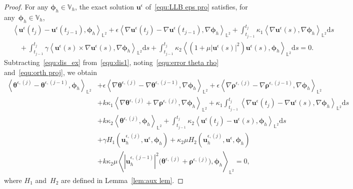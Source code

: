 \documentclass[11pt,reqno]{amsart}
\theoremstyle{definition}
\numberwithin{equation}{section}
\newcommand{\bff}{\boldsymbol}
\newcommand{\bb}{\mathbb}
\newcommand{\ds}{\mathrm{d}s}
\newcommand{\nn}{\nonumber}
\newcommand{\inpro}[2]{\left\langle#1,#2\right\rangle}
\begin{document}
\begin{proof}
For any $ \bff{\phi}_h\in\bb{V}_h$, the exact solution $\bff{u}^\epsilon$
of~\eqref{equ:LLB eps pro} satisfies, for any~$\bff{\phi}_h\in\bb{V}_h$,
\begin{align}\label{equ:dis_ex}
&\inpro{\bff{u}^\epsilon(t_j)-\bff{u}^\epsilon(t_{j-1})}{\bff{\phi}_h}_{\bb{L}^2}
+
\epsilon\inpro{\nabla\bff{u}^\epsilon(t_j)-\nabla\bff{u}^\epsilon(t_{j-1})}{\nabla\bff{\phi}_h}_{\bb{L}^2}
+
\int_{t_{j-1}}^{t_j} \kappa_1 \inpro{\nabla\bff{u}^\epsilon(s)}{\nabla\bff{\phi}_h}_{\bb{L}^2}\ds
\nn\\
&\quad
+
\int_{t_{j-1}}^{t_j}
\gamma \inpro{\bff{u}^\epsilon(s)\times\nabla\bff{u}^\epsilon(s)}{\nabla\bff{\phi}_h}_{\bb{L}^2}\ds
+
\int_{t_{j-1}}^{t_j}
\kappa_2 \inpro{(1+\mu |\bff{u}^\epsilon(s)|^2)\bff{u}^\epsilon(s)}{\bff{\phi}_h}_{\bb{L}^2} \ds
=0.
\end{align}
Subtracting~\eqref{equ:dis_ex} from~\eqref{equ:dis1}, noting~\eqref{equ:error theta rho} and~\eqref{equ:orth proj}, we obtain
\begin{align}\label{equ:theta}
\inpro{\bff{\theta}^{\epsilon, (j)}-\bff{\theta}^{\epsilon, (j-1)}}{\bff{\phi}_h}_{\bb{L}^2}
&+
 \epsilon\inpro{\nabla\bff{\theta}^{\epsilon, (j)}-\nabla\bff{\theta}^{\epsilon, (j-1)}}{\nabla\bff{\phi}_h}_{\bb{L}^2}
 +
 \epsilon\inpro{\nabla\bff{\rho}^{\epsilon, (j)}-\nabla\bff{\rho}^{\epsilon, (j-1)}}{\nabla\bff{\phi}_h}_{\bb{L}^2}
 \nn\\
 &
 +
 k\kappa_1 \inpro{\nabla\bff{\theta}^{\epsilon, (j)}+\nabla \bff{\rho}^{\epsilon, (j)}}{\nabla\bff{\phi}_h}_{\bb{L}^2}
 +
 \kappa_1
 \int_{t_{j-1}}^{t_j} 
 \inpro{\nabla\bff{u}^\epsilon(t_j)- \nabla \bff{u}^\epsilon(s)}{\nabla\bff{\phi}_h}_{\bb{L}^2} \ds
 \nn\\
 &
 + k \kappa_2 \inpro{\bff{\theta}^{\epsilon, (j)}}{\bff{\phi}_h}_{\bb{L}^2}
 +
 \int_{t_{j-1}}^{t_j} \kappa_2 \inpro{\bff{u}^\epsilon(t_j)- \bff{u}^\epsilon(s)}{\bff{\phi}_h}_{\bb{L}^2} \ds 
 \nn\\
 &+
 \gamma H_1(\bff{u}_h^{\epsilon, (j)},\bff{u}^\epsilon,\bff{\phi}_h) 
 + 
 \kappa_2 \mu
 H_2(\bff{u}_h^{\epsilon, (j)},\bff{u}^\epsilon,\bff{\phi}_h) 
 \nn\\
 &
 +
 k \kappa_2 \mu
 \inpro{|\bff{u}_h^{\epsilon, (j-1)}|^2
 \big(\bff{\theta}^{\epsilon, (j)}+\bff{\rho}^{\epsilon, (j)}\big)}{\bff{\phi}_h}_{\bb{L}^2}
 =0,
\end{align}
where $H_1$ and~$H_2$ are defined in Lemma~\ref{lem:aux lem}.


\end{proof}
\end{document}
